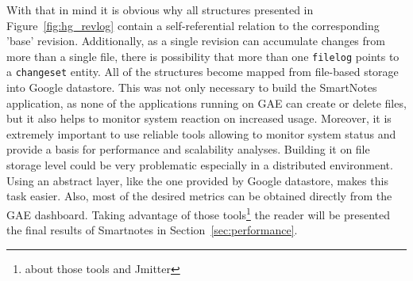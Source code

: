 With that in mind it is obvious why all structures presented in Figure~\ref{fig:hg_revlog} contain a self-referential relation to the corresponding 'base' revision. Additionally, as a single revision can accumulate changes from more than a single file, there is possibility that more than one \texttt{filelog} points to a \texttt{changeset} entity. All of the structures become mapped from file-based storage into Google datastore. This was not only necessary to build the SmartNotes application, as none of the applications running on GAE can create or delete files, but it also helps to monitor system reaction on increased usage. Moreover, it is extremely important to use reliable tools allowing to monitor system status and provide a basis for performance and scalability analyses. Building it on file storage level could be very problematic especially in a distributed environment. Using an abstract layer, like the one provided by Google datastore, makes this task easier. Also, most of the desired metrics can be obtained directly from the GAE dashboard. Taking advantage of those tools\footnote{about those tools and Jmitter} the reader will be presented  the final results of Smartnotes in Section~\ref{sec:performance}.
 
